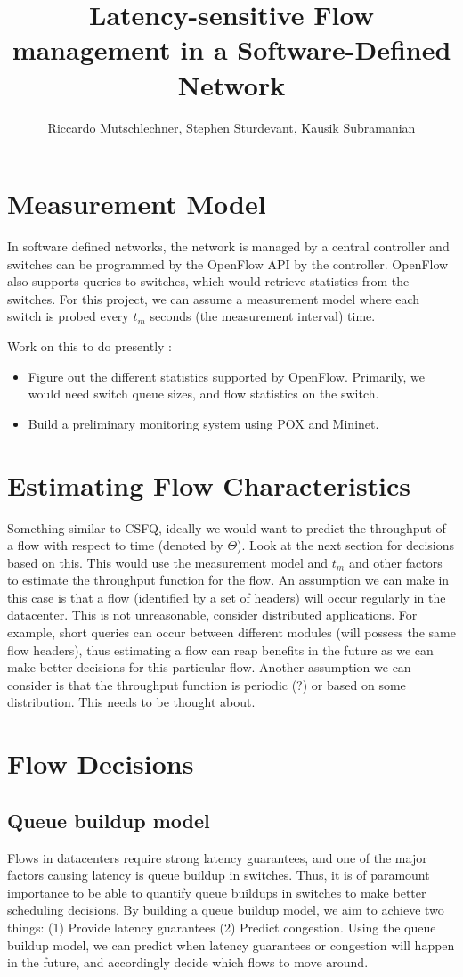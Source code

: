 \documentclass[]{article}
\title{Latency-sensitive Flow management in a Software-Defined Network}
\author{Riccardo Mutschlechner, Stephen Sturdevant, Kausik Subramanian}
\begin{document}
\maketitle

\section{Measurement Model}
In software defined networks, the network is managed by a central controller
and switches can be programmed by  the OpenFlow API by the controller. 
OpenFlow also supports queries to switches, which would retrieve statistics
from the switches. For this project, we can assume a measurement model
where each switch is probed every $t_m$ seconds (the measurement interval)
time. 

Work on this to do presently :
\begin{itemize}
	\item Figure out the different statistics supported by OpenFlow. Primarily, 
	we would need switch queue sizes, and flow statistics on the switch. 
	\item Build a preliminary monitoring system using POX and Mininet. 
\end{itemize}

\section{Estimating Flow Characteristics}
Something similar to CSFQ, ideally we would want to predict the throughput
of a flow with respect to time (denoted by $\Theta$). Look at the next section for decisions based on this. 
This would use the measurement model and $t_m$ and other factors to
estimate the throughput function for the flow. An assumption we can make
in this case is that a flow (identified by a set of headers) will occur 
regularly in the datacenter. This is not unreasonable, consider distributed applications.
For example, short queries can occur between different modules (will possess the
same flow headers), thus estimating a flow can reap benefits in the future as 
we can make better decisions for this particular flow. Another assumption we
can consider is that the throughput function is periodic (?) or based on
some distribution. This needs to be thought about. 

\section{Flow Decisions}
\subsection{Queue buildup model}
Flows in datacenters require strong latency guarantees, and one of the major
factors causing latency is queue buildup in switches. Thus, it is of paramount
importance to be able to quantify queue buildups in switches to make better scheduling
decisions. By building a queue buildup model, we aim to achieve two things: (1) Provide
latency guarantees (2) Predict congestion. Using the queue buildup model, we can predict 
when latency guarantees or congestion will happen in the future, and accordingly 
decide which flows to move around. 
\end{document}
